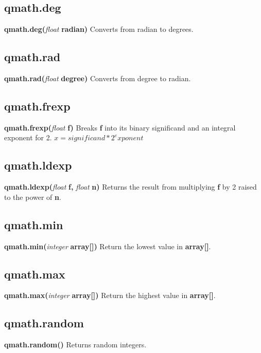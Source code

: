 \documentclass{scrreprt}
\begin{document}
\subsection{qmath.deg}
\label{qm-deg}
\textbf{qmath.deg(}\textit{float}\textbf{ radian)}
\newline
Converts from radian to degrees.
\subsection{qmath.rad}
\label{qm-rad}
\textbf{qmath.rad(}\textit{float}\textbf{ degree)}
\newline
Converts from degree to radian.
\subsection{qmath.frexp}
\label{qm-frexp}
\textbf{qmath.frexp(}\textit{float}\textbf{ f)}
\newline
Breaks \textbf{f} into its binary significand and an integral exponent for 2. 
\newline
\begin{math}x=significand*2^exponent\end{math}
\subsection{qmath.ldexp}
\label{qm-ldexp}
\textbf{qmath.ldexp(}\textit{float}\textbf{ f, }\textit{float}\textbf{ n)}
\newline
Returns the result from multiplying \textbf{f} by 2 raised to the power of \textbf{n}.
\subsection{qmath.min}
\label{qm-min}
\textbf{qmath.min(}\textit{integer}\textbf{ array[])}
\newline
Return the lowest value in \textbf{array[]}.
\subsection{qmath.max}
\label{qm-max}
\textbf{qmath.max(}\textit{integer}\textbf{ array[])}
\newline
Return the highest value in \textbf{array[]}.
\subsection{qmath.random}
\label{qm-random}
\textbf{qmath.random()}
\newline
Returns random integers.
\end{document}
